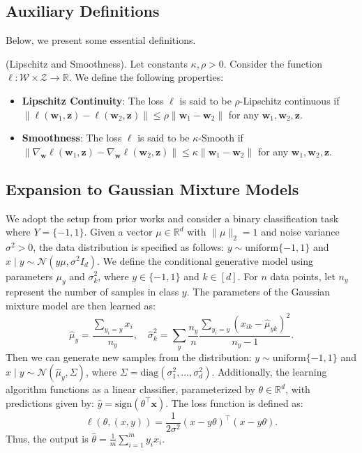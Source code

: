 \subsection{Auxiliary Definitions}\label{appedix_definitu}
Below, we present some essential definitions.
\begin{definition}(Lipschitz and Smoothness). Let constants $\kappa, \rho > 0$. Consider the function $\ell: \mathcal{W} \times \mathcal{Z} \rightarrow \mathbb{R}$. We define the following properties:
\begin{itemize}
    \item \textbf{Lipschitz Continuity}: The loss $\ell$ is said to be $\rho$-Lipschitz continuous if  $\|\ell(\boldsymbol{w}_1, \boldsymbol{z}) - \ell(\boldsymbol{w}_2, \boldsymbol{z})\| \leq \rho \|\boldsymbol{w}_1 - \boldsymbol{w}_2\|$ for any $\boldsymbol{w}_1, \boldsymbol{w}_2, \boldsymbol{z}$.
    \item \textbf{Smoothness}: The loss $\ell$ is said to be $\kappa$-Smooth  if $\|\nabla_{\boldsymbol{w}}\ell(\boldsymbol{w}_1, \boldsymbol{z})-\nabla_{\boldsymbol{w}}\ell(\boldsymbol{w}_2, \boldsymbol{z})\|\leq \kappa\|\boldsymbol{w}_1-\boldsymbol{w}_2\|$ for any $\boldsymbol{w}_1, \boldsymbol{w}_2, \boldsymbol{z}$.
\end{itemize}
\end{definition}


\subsection{Expansion to Gaussian Mixture Models}


We adopt the setup from prior works \cite{zheng2023toward} and consider a binary classification task where \(Y = \{-1, 1\}\). Given a vector \(\mu \in \mathbb{R}^d\) with \(\|\mu\|_2 = 1\) and noise variance \(\sigma^2 > 0\), the data distribution is specified as follows: \(y \sim \text{uniform}\{-1, 1\}\) and \(x \mid y \sim \mathcal{N}(y \mu, \sigma^2 I_d)\). We define the conditional generative model using parameters \(\mu_y\) and \(\sigma_k^2\), where \(y \in \{-1, 1\}\) and \(k \in [d]\). For \(n\) data points, let \(n_y\) represent the number of samples in class \(y\). The parameters of the Gaussian mixture model are then learned as:
\[
\hat{\mu}_y = \frac{\sum_{y_i = y} x_i}{n_y}, \quad
\hat{\sigma}_k^2 = \sum_y \frac{n_y}{n} \frac{\sum_{y_i = y} (x_{ik} - \hat{\mu}_{yk})^2}{n_y - 1}.
\]
Then we can generate new samples from the distribution: \(y \sim \text{uniform}\{-1, 1\}\) and \(x \mid y \sim \mathcal{N}(\hat{\mu}_y, \Sigma)\), where \(\Sigma = \text{diag}(\sigma_1^2, \dots, \sigma_d^2)\). Additionally, the learning algorithm functions as a linear classifier, parameterized by \(\theta \in \mathbb{R}^d\), with predictions given by: $\hat{y} = \text{sign}(\theta^\top \mathbf{x})$. The loss function is defined as:  
\[
\ell(\theta, (x, y)) = \frac{1}{2\sigma^2} (x - y\theta)^\top (x - y\theta).
\]
Thus, the output is  
\(
\hat{\theta} = \frac{1}{m} \sum_{i=1}^m y_i x_i.
\)

